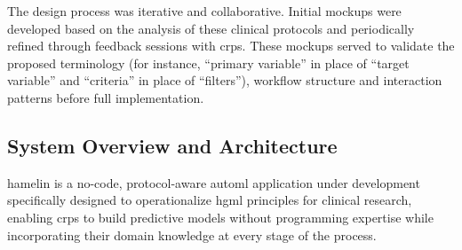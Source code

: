 \documentclass[conference,twocolumn]{IEEEtran}
\begin{document}
The design process was iterative and collaborative. Initial mockups were developed based on the analysis of these clinical protocols and periodically refined through feedback sessions with \glspl{crp}. These mockups served to validate the proposed terminology (for instance, ``primary variable'' in place 
of ``target variable'' and ``criteria'' in place of ``filters''), workflow structure and interaction patterns before full implementation.
  
\subsection{System Overview and Architecture}
\label{subsec:architecture}

\gls{hamelin} is a no-code, protocol-aware \gls{automl} application under development specifically designed to operationalize \gls{hgml} principles for clinical research, enabling \glspl{crp} to build predictive models without programming expertise while incorporating their domain knowledge at every stage of the process.
\end{document}
